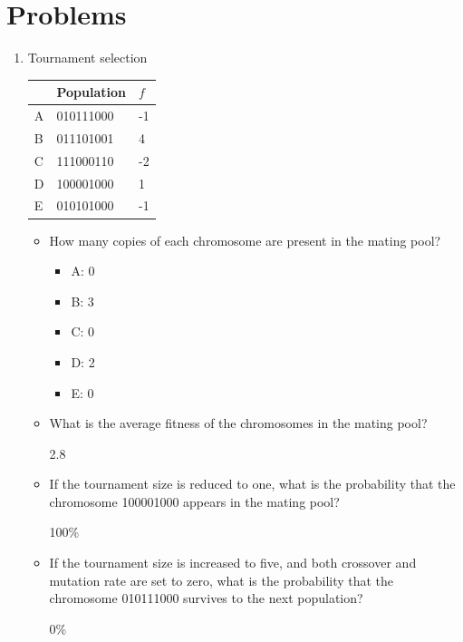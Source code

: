 \documentclass{article}
\begin{document}
\section*{Problems}
\begin{enumerate}
    \item Tournament selection
    \begin{table}[h]
        \centering
        \begin{tabular}{l|l|l}
            & Population & $f$ \\
            \hline
            A & 010111000  & -1 \\
            B & 011101001  & 4 \\
            C & 111000110  & -2 \\
            D & 100001000  & 1 \\
            E & 010101000  & -1
        \end{tabular}
    \end{table}
    \begin{itemize}
        \item How many copies of each chromosome are present in the mating pool?
        \begin{itemize}
            \item A: 0
            \item B: 3
            \item C: 0
            \item D: 2
            \item E: 0
        \end{itemize}
        \item What is the average fitness of the chromosomes in the mating pool? 
        
        2.8

        \item If the tournament size is reduced to one, what is the probability that the chromosome 100001000 appears in the mating pool?
        
        100\%

        \item If the tournament size is increased to five, and both crossover and mutation rate are set to zero, what is the probability that the chromosome 010111000 survives to the next population?
        
        0\%

    \end{itemize}
    

\end{enumerate}
\end{document}
